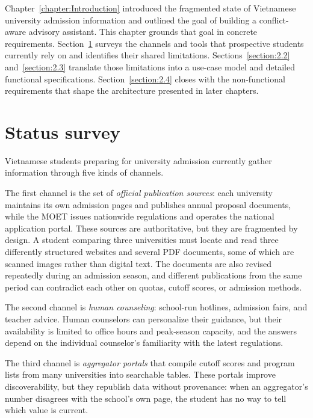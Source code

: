 \documentclass[../main.tex]{subfiles}
\begin{document}

Chapter~\ref{chapter:Introduction} introduced the fragmented state of Vietnamese university admission information and outlined the goal of building a conflict-aware advisory assistant.
This chapter grounds that goal in concrete requirements.
Section~\ref{section:2.1} surveys the channels and tools that prospective students currently rely on and identifies their shared limitations.
Sections~\ref{section:2.2} and~\ref{section:2.3} translate those limitations into a use-case model and detailed functional specifications.
Section~\ref{section:2.4} closes with the non-functional requirements that shape the architecture presented in later chapters.

\section{Status survey}
\label{section:2.1}

Vietnamese students preparing for university admission currently gather information through five kinds of channels.

The first channel is the set of \textit{official publication sources}: each university maintains its own admission pages and publishes annual proposal documents, while the \gls{MOET} issues nationwide regulations and operates the national application portal.
These sources are authoritative, but they are fragmented by design.
A student comparing three universities must locate and read three differently structured websites and several \gls{PDF} documents, some of which are scanned images rather than digital text.
The documents are also revised repeatedly during an admission season, and different publications from the same period can contradict each other on quotas, cutoff scores, or admission methods.

The second channel is \textit{human counseling}: school-run hotlines, admission fairs, and teacher advice.
Human counselors can personalize their guidance, but their availability is limited to office hours and peak-season capacity, and the answers depend on the individual counselor's familiarity with the latest regulations.

The third channel is \textit{aggregator portals} that compile cutoff scores and program lists from many universities into searchable tables.
These portals improve discoverability, but they republish data without provenance: when an aggregator's number disagrees with the school's own page, the student has no way to tell which value is current.
\end{document}
